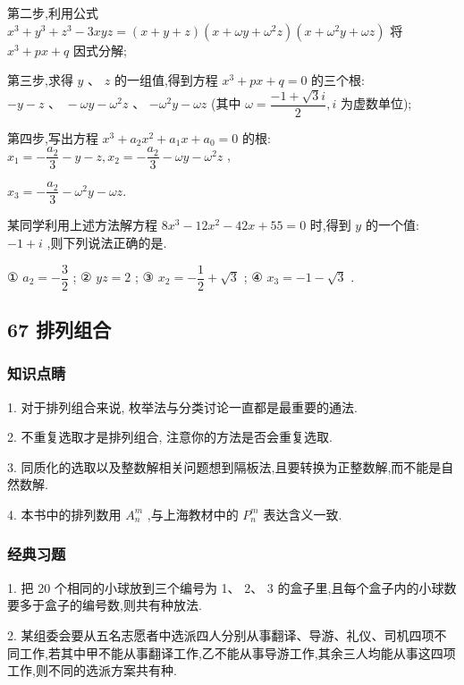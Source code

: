 第二步,利用公式 ${x}^{3} + {y}^{3} + {z}^{3} - {3xyz} = \left( {x + y + z}\right) \left( {x + {\omega y} + {\omega }^{2}z}\right) \left( {x + {\omega }^{2}y + {\omega z}}\right)$ 将 ${x}^{3} + {px} + q$ 因式分解;

第三步,求得 $y\text{ 、 }z$ 的一组值,得到方程 ${x}^{3} + {px} + q = 0$ 的三个根: $- y - z\text{ 、 } - {\omega y} - {\omega }^{2}z$ 、 $- {\omega }^{2}y - {\omega z}$ (其中 $\omega  = \dfrac{-1 + \sqrt{3}{i}}{2},{i}$ 为虚数单位);

第四步,写出方程 ${x}^{3} + {a}_{2}{x}^{2} + {a}_{1}x + {a}_{0} = 0$ 的根: ${x}_{1} =  - \dfrac{{a}_{2}}{3} - y - z,{x}_{2} =  - \dfrac{{a}_{2}}{3} - {\omega y} - {\omega }^{2}z$ ,

${x}_{3} =  - \dfrac{{a}_{2}}{3} - {\omega }^{2}y - {\omega z}.$

某同学利用上述方法解方程 $8{x}^{3} - {12}{x}^{2} - {42x} + {55} = 0$ 时,得到 $y$ 的一个值: $- 1 + {i}$ ,则下列说法正确的是\blkda{}.

① ${a}_{2} =  - \dfrac{3}{2}$ ; ② ${yz} = 2$ ; ③ ${x}_{2} =  - \dfrac{1}{2} + \sqrt{3}$ ; ④ ${x}_{3} =  - 1 - \sqrt{3}$ .

\subsection*{67 排列组合}

\subsubsection*{知识点睛}

1. 对于排列组合来说, 枚举法与分类讨论一直都是最重要的通法.

2. 不重复选取才是排列组合, 注意你的方法是否会重复选取.

3. 同质化的选取以及整数解相关问题想到隔板法,且要转换为正整数解,而不能是自然数解.

4. 本书中的排列数用 ${{A}}_{n}^{m}$ ,与上海教材中的 ${{P}}_{n}^{m}$ 表达含义一致.

\subsubsection*{经典习题}

1. 把 20 个相同的小球放到三个编号为 1、 2、 3 的盒子里,且每个盒子内的小球数要多于盒子的编号数,则共有\blkda{}种放法.

2. 某组委会要从五名志愿者中选派四人分别从事翻译、导游、礼仪、司机四项不同工作,若其中甲不能从事翻译工作,乙不能从事导游工作,其余三人均能从事这四项工作,则不同的选派方案共有\blkda{}种.

